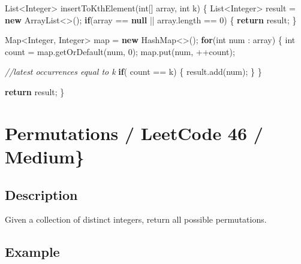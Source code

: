 \documentclass[]{book}
\newenvironment{Shaded}{\begin{snugshade}}{\end{snugshade}}
\newcommand{\BuiltInTok}[1]{#1}
\newcommand{\CommentTok}[1]{\textcolor[rgb]{0.56,0.35,0.01}{\textit{#1}}}
\newcommand{\DataTypeTok}[1]{\textcolor[rgb]{0.13,0.29,0.53}{#1}}
\newcommand{\DecValTok}[1]{\textcolor[rgb]{0.00,0.00,0.81}{#1}}
\newcommand{\FunctionTok}[1]{\textcolor[rgb]{0.00,0.00,0.00}{#1}}
\newcommand{\KeywordTok}[1]{\textcolor[rgb]{0.13,0.29,0.53}{\textbf{#1}}}
\newcommand{\NormalTok}[1]{#1}
\begin{document}
\begin{Shaded}
\begin{Highlighting}[]
\BuiltInTok{List}\NormalTok{<}\BuiltInTok{Integer}\NormalTok{> }\FunctionTok{insertToKthElement}\NormalTok{(}\DataTypeTok{int}\NormalTok{[] array, }\DataTypeTok{int}\NormalTok{ k) \{}
    \BuiltInTok{List}\NormalTok{<}\BuiltInTok{Integer}\NormalTok{> result = }\KeywordTok{new} \BuiltInTok{ArrayList}\NormalTok{<>();}
    \KeywordTok{if}\NormalTok{(array == }\KeywordTok{null}\NormalTok{ || array.}\FunctionTok{length}\NormalTok{ == }\DecValTok{0}\NormalTok{) \{}
        \KeywordTok{return}\NormalTok{ result;}
\NormalTok{    \}}

    \BuiltInTok{Map}\NormalTok{<}\BuiltInTok{Integer}\NormalTok{, }\BuiltInTok{Integer}\NormalTok{> map = }\KeywordTok{new} \BuiltInTok{HashMap}\NormalTok{<>();}
    \KeywordTok{for}\NormalTok{(}\DataTypeTok{int}\NormalTok{ num : array) \{}
        \DataTypeTok{int}\NormalTok{ count = map.}\FunctionTok{getOrDefault}\NormalTok{(num, }\DecValTok{0}\NormalTok{);}
\NormalTok{        map.}\FunctionTok{put}\NormalTok{(num, ++count);}

        \CommentTok{//latest occurrences equal to k}
        \KeywordTok{if}\NormalTok{( count == k) \{}
\NormalTok{            result.}\FunctionTok{add}\NormalTok{(num);}
\NormalTok{        \}}
\NormalTok{    \}}

    \KeywordTok{return}\NormalTok{ result;}
\NormalTok{\}}
\end{Highlighting}
\end{Shaded}

\hypertarget{permutations-leetcode-46-medium}{%
\section{Permutations / LeetCode 46 / Medium\}}\label{permutations-leetcode-46-medium}}

\hypertarget{description-14}{%
\subsection{Description}\label{description-14}}

Given a collection of distinct integers, return all possible permutations.

\hypertarget{example-13}{%
\subsection{Example}\label{example-13}}
\end{document}
